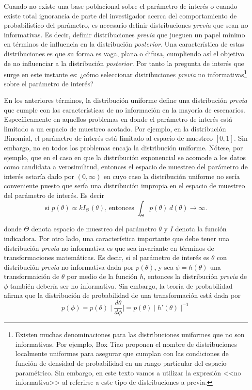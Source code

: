 \documentclass[
  spanish,
  letter]{book}
\theoremstyle{definition}
\theoremstyle{definition}
\theoremstyle{definition}
\theoremstyle{remark}
\begin{document}
Cuando no existe una base poblacional sobre el parámetro de interés o cuando existe total ignorancia de parte del investigador acerca del comportamiento de probabilístico del parámetro, es necesario definir distribuciones \emph{previa} que sean no informativas. Es decir, definir distribuciones \emph{previa} que jueguen un papel mínimo en términos de influencia en la distribución \emph{posterior}. Una característica de estas distribuciones es que su forma es vaga, plana o difusa, cumpliendo así el objetivo de no influenciar a la distribución \emph{posterior}. Por tanto la pregunta de interés que surge en este instante es: ¿cómo seleccionar distribuciones \emph{previa} no informativas\footnote{Existen muchas denominaciones para las distribuciones uniformes que no son informativas. Por ejemplo, Box Tiao proponen el nombre de distribuciones localmente uniformes para asegurar que cumplan con las condiciones de función de densidad de probabilidad en un rango particular del espacio paramétrico. Sin embargo, en este texto vamos a utilizar la expresión <<no informativa>> al referirse a este tipo de distribuciones a previa.} sobre el parámetro de interés?

En los anteriores términos, la distribución uniforme define una distribución \emph{previa} que cumple con las características de no información en la mayoría de escenarios. Específicamente en aquellos problemas en donde el parámetro de interés está limitado a un espacio de muestreo acotado. Por ejemplo, en la distribución Binomial, el parámetro de interés está limitado al espacio de muestreo \([0,1]\). Sin embargo, no en todos los problemas encaja la distribución uniforme. Nótese, por ejemplo, que en el caso en que la distribución exponencial se acomode a los datos como candidata a verosimilitud, entonces el espacio de muestreo del parámetro de interés estaría dado por \((0,\infty)\) en cuyo caso la distribución uniforme no sería conveniente puesto que sería una distribución impropia en el espacio de muestreo del parámetro de interés. Es decir
\begin{equation*}
\text{si } p(\theta)\propto kI_{\Theta}(\theta) \text{, entonces } \int_{\Theta}p(\theta) \ d(\theta)\longrightarrow \infty.
\end{equation*}

donde \(\Theta\) denota espacio de muestreo del parámetro \(\theta\) y \(I\) denota la función indicadora. Por otro lado, una característica importante que debe tener una distribución \emph{previa} no informativa es que sea invariante en términos de transformaciones matemáticas. Es decir, si el parámetro de interés es \(\theta\) con distribución \emph{previa} no informativa dada por \(p(\theta)\), y sea \(\phi=h(\theta)\) una transformaición de \(\theta\) por medio de la función \(h\), entonces la distribución \emph{previa} de \(\phi\) también debería ser no informativa. Sin embargo, la teoría de probabilidad afirma que la distribución de probabilidad de una transformación está dada por
\begin{equation}\label{teo_transf}
p(\phi)=p(\theta) \mid \frac{d\theta}{d\phi} \mid =p(\theta) \mid h'(\theta) \mid ^{-1}
\end{equation}
\end{document}
